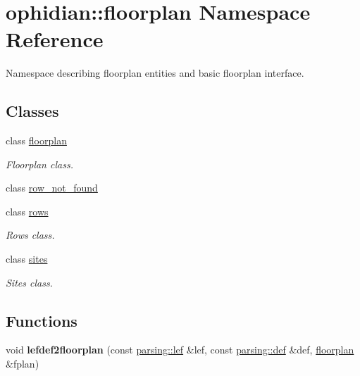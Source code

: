 \hypertarget{namespaceophidian_1_1floorplan}{\section{ophidian\-:\-:floorplan Namespace Reference}
\label{namespaceophidian_1_1floorplan}
}


Namespace describing floorplan entities and basic floorplan interface.  


\subsection*{Classes}
\begin{DoxyCompactItemize}
\item 
class \hyperlink{classophidian_1_1floorplan_1_1floorplan}{floorplan}
\begin{DoxyCompactList}\small\item\em Floorplan class. \end{DoxyCompactList}\item 
class \hyperlink{classophidian_1_1floorplan_1_1row__not__found}{row\-\_\-not\-\_\-found}
\item 
class \hyperlink{classophidian_1_1floorplan_1_1rows}{rows}
\begin{DoxyCompactList}\small\item\em Rows class. \end{DoxyCompactList}\item 
class \hyperlink{classophidian_1_1floorplan_1_1sites}{sites}
\begin{DoxyCompactList}\small\item\em Sites class. \end{DoxyCompactList}\end{DoxyCompactItemize}
\subsection*{Functions}
\begin{DoxyCompactItemize}
\item 
\hypertarget{namespaceophidian_1_1floorplan_a1051278d51eb633131b5f392b5a35a96}{void {\bfseries lefdef2floorplan} (const \hyperlink{classophidian_1_1parsing_1_1lef}{parsing\-::lef} \&lef, const \hyperlink{classophidian_1_1parsing_1_1def}{parsing\-::def} \&def, \hyperlink{classophidian_1_1floorplan_1_1floorplan}{floorplan} \&fplan)}\label{namespaceophidian_1_1floorplan_a1051278d51eb633131b5f392b5a35a96}

\end{DoxyCompactItemize}
